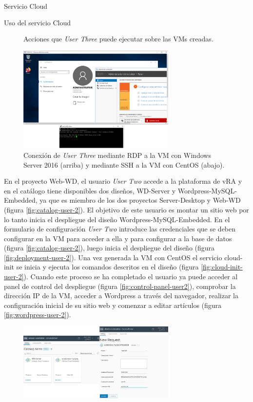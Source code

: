 \begin{subsection}{Servicio Cloud}
\begin{subsubsection}{Uso del servicio Cloud}
\begin{figure}[h]
            \caption{Acciones que \textit{User Three} puede ejecutar sobre las VMs creadas.}
            \label{fig:user3-actions}
        \end{figure}
        \FloatBarrier
        \begin{figure}[h]
            \centering
            \includegraphics[width=0.7\textwidth]{imaxes/pruebaconcepto/vrealize/Windows-RDP.png}
            \caption{Conexión de \textit{User Three} mediante RDP a la VM con Windows Server 2016 (arriba) y mediante SSH a la VM con CentOS (abajo).}
            \label{fig:vm-cent-win-connection}
        \end{figure}
        \FloatBarrier
        En el proyecto Web-WD, el usuario \textit{User Two} accede a la plataforma de vRA y en el catálogo tiene disponibles dos diseños, WD-Server y Wordpress-MySQL-Embedded, ya que es miembro de los dos proyectos Server-Desktop y Web-WD (figura \ref{fig:catalog-user-2}). El objetivo de este usuario es montar un sitio web por lo tanto inicia el despliegue del diseño Wordpress-MySQL-Embedded. En el formulario de configuración \textit{User Two} introduce las credenciales que se deben configurar en la VM para acceder a ella y para configurar a la base de datos  (figura \ref{fig:catalog-user-2}), luego inicia el despliegue del diseño (figura \ref{fig:deployment-user-2}). Una vez generada la VM con CentOS el servicio cloud-init se inicia y ejecuta los comandos descritos en el diseño (figura \ref{fig:cloud-init-user-2}). Cuando este proceso se ha completado el usuario ya puede acceder al panel de control del despliegue (figura \ref{fig:control-panel-user2}), comprobar la dirección IP de la VM, acceder a Wordpress a través del navegador, realizar la configuración inicial de su sitio web y comenzar a editar artículos (figura \ref{fig:wordpress-user-2}).
        \begin{figure}[h]
            \centering
            \includegraphics[width=0.7\textwidth]{imaxes/pruebaconcepto/vrealize/user-two-catalog.png}

\end{figure}
\end{subsubsection}
\end{subsection}
